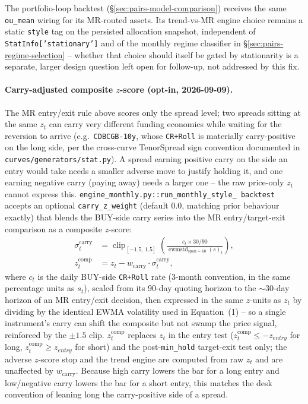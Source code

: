 The portfolio-loop backtest (\S\ref{sec:pairs-model-comparison}) receives the same
\texttt{ou\_mean} wiring for its MR-routed assets. Its trend-vs-MR engine choice
remains a static \texttt{style} tag on the persisted allocation snapshot, independent
of \texttt{StatInfo['stationary']} and of the monthly regime classifier in
\S\ref{sec:pairs-regime-selection} -- whether that choice should itself be gated by
stationarity is a separate, larger design question left open for follow-up, not
addressed by this fix.

\paragraph{Carry-adjusted composite $z$-score (opt-in, 2026-09-09).} The MR entry/exit
rule above scores only the spread level; two spreads sitting at the same $z_t$ can
carry very different funding economics while waiting for the reversion to arrive
(e.g.\ \texttt{CDBCGB-10y}, whose \texttt{CR+Roll} is materially carry-positive on the
long side, per the cross-curve TenorSpread sign convention documented in
\texttt{curves/generators/stat.py}). A spread earning positive carry
on the side an entry would take needs a smaller adverse move to justify holding it,
and one earning negative carry (paying away) needs a larger one -- the raw
price-only $z_t$ cannot express this. \texttt{engine\_monthly.py::run\_monthly\_style\_
backtest} accepts an optional \texttt{carry\_z\_weight} (default $0.0$, matching prior
behaviour exactly) that blends the BUY-side carry series into the MR entry/target-exit
comparison as a composite $z$-score:
\begin{align}
\sigma^{\mathrm{carry}}_t &= \operatorname{clip}_{[-1.5,\,1.5]}\!\left(
  \frac{c_t \times 30/90}{\operatorname{ewmstd}_{\mathrm{span}=60}(s)_t}\right), \\
z^{\mathrm{comp}}_t &= z_t - w_{\mathrm{carry}} \cdot \sigma^{\mathrm{carry}}_t,
\end{align}
where $c_t$ is the daily BUY-side \texttt{CR+Roll} rate (3-month convention, in the
same percentage units as $s_t$), scaled from its 90-day quoting horizon to the
$\sim$30-day horizon of an MR entry/exit decision, then expressed in the same
$z$-units as $z_t$ by dividing by the identical EWMA volatility used in
Equation~(1) -- so a single instrument's carry can shift the composite but not swamp
the price signal, reinforced by the $\pm1.5$ clip. $z^{\mathrm{comp}}_t$ replaces
$z_t$ in the entry test ($z^{\mathrm{comp}}_t \le -z_{entry}$ for long,
$z^{\mathrm{comp}}_t \ge z_{entry}$ for short) and the post-\texttt{min\_hold}
target-exit test only; the adverse $z$-score stop and the trend engine are computed
from raw $z_t$ and are unaffected by $w_{\mathrm{carry}}$. Because high carry lowers
the bar for a long entry and low/negative carry lowers the bar for a short entry, this
matches the desk convention of leaning long the carry-positive side of a spread.

